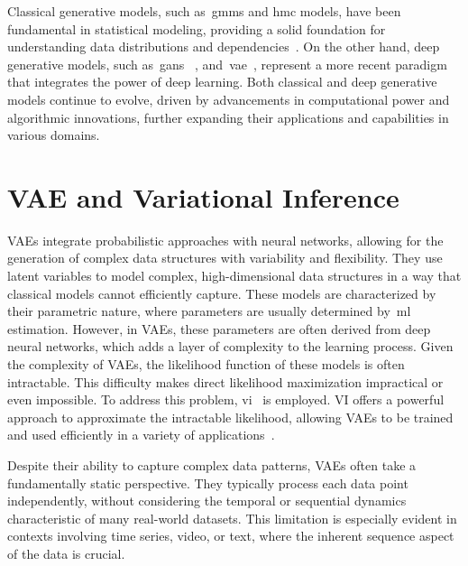 Classical generative models, such as~\gls*{gmms}  and
\gls*{hmc} models, have been fundamental in statistical modeling,
providing a solid foundation for understanding data distributions and
dependencies~\citep{harshvardhan2020comprehensive}. 
On the other hand, deep generative
models, such as~\gls*{gans} ~\citep{goodfellow2020generative},
and~\gls*{vae}~\citep{kingma2014}, 
represent a more recent paradigm that integrates the power of deep learning.
Both classical and deep
generative models continue to evolve, driven by advancements in computational
power and algorithmic innovations, further expanding their applications and
capabilities in various domains.

\vspace{.30cm}
\section*{VAE and Variational Inference}

VAEs integrate probabilistic approaches with neural
networks, allowing for the generation of complex data structures with
variability and flexibility. 
They use latent variables to model complex, high-dimensional data structures in
a way that classical models cannot efficiently capture. These models are
characterized by their parametric nature, where parameters are usually
determined by~\gls*{ml} estimation. However, in VAEs, these parameters are often
derived from deep neural networks, which adds a layer of complexity to the
learning process. 
Given the complexity of VAEs, the likelihood function of these
models is often intractable. This difficulty makes direct likelihood
maximization impractical or even impossible. To address this 
 problem, \gls*{vi}~\citep{jaakkola2000bayesian,Blei_2017} 
is employed. VI offers a powerful approach to approximate the
intractable likelihood, allowing VAEs to be trained and used efficiently in a
variety of applications~\citep{an2015variational, pu2016variational,
xu2017variational, chira2022image}.


Despite their ability to capture complex data patterns, VAEs often take a
fundamentally static perspective. They typically process each data point
independently, without considering the temporal or sequential dynamics
characteristic of many real-world datasets. This limitation is especially
evident in contexts involving time series, video, or text, where the inherent
sequence aspect of the data is crucial.

\newpage
